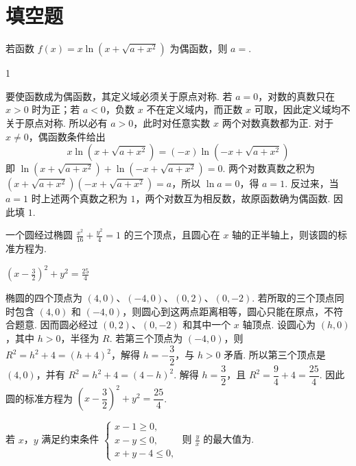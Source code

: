 \section{填空题}

\begin{problem}
若函数 \( f(x) = x \ln \left( x + \sqrt{a + x^2} \right) \) 为偶函数，则 \( a = \)\fillinblank{}.
\end{problem}

\begin{answer}
1
\end{answer}

\begin{solution}
要使函数成为偶函数，其定义域必须关于原点对称. 若 \(a=0\)，对数的真数只在 \(x>0\) 时为正；若 \(a<0\)，负数 \(x\) 不在定义域内，而正数 \(x\) 可取，因此定义域均不关于原点对称. 所以必有 \(a>0\)，此时对任意实数 \(x\) 两个对数真数都为正. 对于 \(x\ne0\)，偶函数条件给出
\[
x\ln\left(x+\sqrt{a+x^2}\right)=(-x)\ln\left(-x+\sqrt{a+x^2}\right)
\]
即
\(\ln\left(x+\sqrt{a+x^2}\right)+\ln\left(-x+\sqrt{a+x^2}\right)=0\). 两个对数真数之积为
\(\left(x+\sqrt{a+x^2}\right)\left(-x+\sqrt{a+x^2}\right)=a\)，所以 \(\ln a=0\)，得 \(a=1\). 反过来，当 \(a=1\) 时上述两个真数之积为 \(1\)，两个对数互为相反数，故原函数确为偶函数. 因此填 \(1\).
\end{solution}

\begin{problem}
一个圆经过椭圆 \(\frac{x^2}{16} + \frac{y^2}{4} = 1\) 的三个顶点，且圆心在 \(x\) 轴的正半轴上，则该圆的标准方程为\fillinblank{}.
\end{problem}

\begin{answer}
\(\left(x-\frac{3}{2}\right)^2+y^2=\frac{25}{4}\)
\end{answer}

\begin{solution}
椭圆的四个顶点为 \((4,0)\)、\((-4,0)\)、\((0,2)\)、\((0,-2)\). 若所取的三个顶点同时包含 \((4,0)\) 和 \((-4,0)\)，则圆心到这两点距离相等，圆心只能在原点，不符合题意. 因而圆必经过 \((0,2)\)、\((0,-2)\) 和其中一个 \(x\) 轴顶点. 设圆心为 \((h,0)\)，其中 \(h>0\)，半径为 \(R\). 若第三个顶点为 \((-4,0)\)，则 \(R^2=h^2+4=(h+4)^2\)，解得 \(h=-\dfrac32\)，与 \(h>0\) 矛盾. 所以第三个顶点是 \((4,0)\)，并有
\(R^2=h^2+4=(4-h)^2\). 解得 \(h=\dfrac32\)，且 \(R^2=\dfrac94+4=\dfrac{25}{4}\). 因此圆的标准方程为 \(\left(x-\dfrac32\right)^2+y^2=\dfrac{25}{4}\).
\end{solution}

\begin{problem}
若 \(x\)，\(y\) 满足约束条件 \(\begin{cases}
x - 1 \geqslant 0,\\
x - y \leqslant 0,\\
x + y - 4 \leqslant 0,
\end{cases}\) 则 \(\frac{y}{x}\) 的最大值为\fillinblank{}.
\end{problem}

